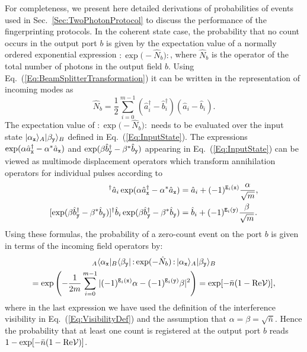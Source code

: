 \documentclass[10pt]{article}
\newcommand{\ket}[2][]{{|#2\rangle_{#1}}}
\newcommand{\bra}[2][]{{}_{#1}\langle #2|}
\begin{document}
For completeness, we present here detailed derivations of probabilities of events used in Sec.~\ref{Sec:TwoPhotonProtocol} to discuss the performance of the fingerprinting protocols. In the coherent state case, the probability that no count occurs in the output port $b$ is given by the expectation value of a normally ordered exponential expression $\mathop{:}\exp\bigl( - \hat{N}_b \bigr) \mathop{:}$, where $\hat{N}_b$ is the operator of the total number of photons in the output field $b$. Using Eq.~(\ref{Eq:BeamSplitterTransformation}) it can be written in the representation of incoming modes as
\begin{equation}
\hat{N}_b = \frac{1}{2} \sum_{i=0}^{m-1} (\hat{a}_i^\dagger - \hat{b}_{i}^\dagger)(\hat{a}_i - \hat{b}_{i}  ) .
\end{equation}
The expectation value of $\mathop{:}\exp\bigl( - \hat{N}_b \bigr) \mathop{:}$ needs to be evaluated
over the input state $\ket[A]{\alpha_{\tt x}}\ket[B]{\beta_{\tt y}}$ defined in Eq.~(\ref{Eq:InputState}). The expressions $\exp(\alpha\hat{a}_{\tt x}^\dagger - \alpha^\ast \hat{a}_{\tt x})$ and $\exp(\beta\hat{b}_{\tt y}^\dagger - \beta^\ast \hat{b}_{\tt y})$ appearing in  Eq.~(\ref{Eq:InputState}) can be viewed as multimode displacement operators which transform annihilation operators for individual pulses according to
\begin{align}
[\exp(\alpha\hat{a}_{\tt x}^\dagger - \alpha^\ast \hat{a}_{\tt x})]^\dagger \hat{a}_i \exp(\alpha\hat{a}_{\tt x}^\dagger - \alpha^\ast \hat{a}_{\tt x}) & = \hat{a}_i +  (-1)^{{\tt E}_i({\tt x})} \frac{\alpha}{\sqrt{m}}, \nonumber \\
[\exp(\beta\hat{b}_{\tt y}^\dagger - \beta^\ast \hat{b}_{\tt y})]^\dagger \hat{b}_i \exp(\beta\hat{b}_{\tt y}^\dagger - \beta^\ast \hat{b}_{\tt y}) & = \hat{b}_i +  (-1)^{{\tt E}_i({\tt y})} \frac{\beta}{\sqrt{m}}.
\end{align}
Using these formulas, the probability of a zero-count event on the port $b$ is given in terms of the incoming field operators by:
\begin{multline}
\bra[A]{\alpha_{\tt x}}\bra[B]{\beta_{\tt y}}
\mathop{:}\exp ( -\hat{N}_b )\mathop{:}
\ket[A]{\alpha_{\tt x}}\ket[B]{\beta_{\tt y}} \\
= \exp\left( - \frac{1}{2m} \sum_{i=0}^{m-1} | (-1)^{{\tt E}_i({\tt x})} \alpha - (-1)^{{\tt E}_i({\tt y})} \beta|^2  \right)
= \exp[-\bar{n} (1- \text{Re} {\cal V})],
\end{multline}
where in the last expression we have used the definition of the interference visibility in Eq.~(\ref{Eq:VisibilityDef}) and the assumption that $\alpha= \beta = \sqrt{\bar{n}}$. Hence the probability that at least one count is registered at the output port $b$ reads $1-\exp[-\bar{n} (1- \text{Re} {\cal V})]$.
\end{document}
